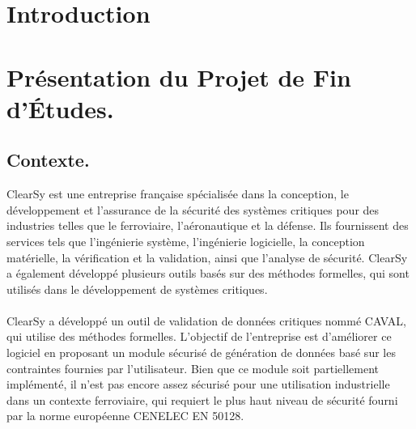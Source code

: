 \documentclass[init,francais]{rapportPFE}  %
\begin{document}
\begin{ResumeMotsCles}
\end{ResumeMotsCles}








\tableofcontents


\section{Introduction}

\section{Présentation du Projet de Fin d'Études.}
\subsection{Contexte.}
ClearSy est une entreprise française spécialisée dans la conception, le développement et l'assurance de la sécurité des systèmes critiques 
pour des industries telles que le ferroviaire, l'aéronautique et la défense. 
Ils fournissent des services tels que l'ingénierie système, l'ingénierie logicielle, la conception matérielle, la vérification et la validation, ainsi que l'analyse de sécurité. ClearSy a également développé plusieurs outils basés sur des méthodes formelles, qui sont utilisés dans le développement de systèmes critiques.
\\~\\
ClearSy a développé un outil de validation de données critiques nommé CAVAL, qui utilise des méthodes formelles. L'objectif de l'entreprise est d'améliorer ce logiciel en proposant un module sécurisé de génération de données basé sur les contraintes fournies par l'utilisateur. Bien que ce module soit partiellement implémenté, il n'est pas encore assez sécurisé pour une utilisation industrielle dans un contexte ferroviaire, qui requiert le plus haut niveau de sécurité fourni par la norme européenne CENELEC EN 50128.
\end{document}
